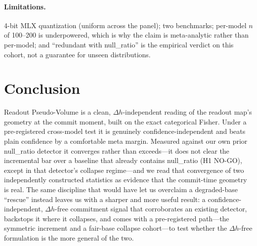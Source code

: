 \documentclass[10pt, letterpaper]{article}
\newcommand{\nullr}{\textsf{null\_ratio}}
\begin{document}
\paragraph{Limitations.}
4-bit MLX quantization (uniform across the panel); two benchmarks;
per-model $n$ of 100--200 is underpowered, which is why the claim is
meta-analytic rather than per-model; and ``redundant with \nullr{}''
is the empirical verdict on this cohort, not a guarantee for unseen
distributions.

\section{Conclusion}

Readout Pseudo-Volume is a clean, $\Delta h$-independent reading of the
readout map's geometry at the commit moment, built on the exact
categorical Fisher. Under a pre-registered cross-model test it is
genuinely confidence-independent and beats plain confidence by a
comfortable meta margin. Measured against our own prior \nullr{}
detector it converges rather than exceeds---it does not clear the
incremental bar over a baseline that already contains \nullr{} (H1
NO-GO), except in that detector's collapse regime---and we read that
convergence of two independently constructed statistics as evidence that
the commit-time geometry is real. The same discipline that would have
let us overclaim a degraded-base ``rescue'' instead leaves us with a
sharper and more useful result: a confidence-independent, $\Delta h$-free
commitment signal that corroborates an existing detector, backstops it
where it collapses, and comes with a pre-registered path---the symmetric
increment and a fair-base collapse cohort---to test whether the
$\Delta h$-free formulation is the more general of the two.
\end{document}
